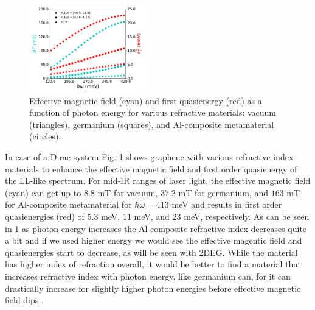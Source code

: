 \begin{figure}
  \includegraphics[width=0.45\textwidth]{./figures/dirac-eff-bfield-energy.pdf}
  \caption{Effective magnetic field (cyan) and first quasienergy (red) as a function of photon energy for various refractive materials: vacuum (triangles), germanium (squares), and  Al-composite metamaterial (circles).}
  \label{fig:dirac-bfield-energy}
\end{figure}

In case of a Dirac system Fig. \ref{fig:dirac-bfield-energy} shows graphene with various refractive index materials to enhance the effective magnetic field and first order quasienergy of the LL-like spectrum.
For mid-IR ranges of laser light, the effective magnetic field (cyan) can get up to $8.8$ mT for vacuum, $37.2$ mT for germanium, and $163$ mT for Al-composite metamaterial for $\hbar\omega=413$ meV and results in first order quasienergies (red) of $5.3$ meV, $11$ meV, and $23$ meV, respectively.
As can be seen in \ref{fig:dirac-bfield-energy} as photon energy increases the Al-composite refractive index decreases quite a bit and if we used higher energy we would see the effective magentic field and quasienergies start to decrease, as will be seen with 2DEG.
While the material has higher index of refraction overall, it would be better to find a material that increases refractive index with photon energy, like germanium can, for it can drastically increase for slightly higher photon energies before effective magnetic field dips \cite{amotchkinaCharacterizationEbeamEvaporated2020}.

